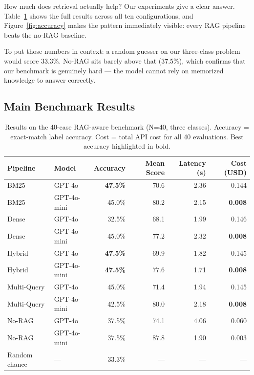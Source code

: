 How much does retrieval actually help? Our experiments give a clear answer.
Table~\ref{tab:main_results} shows the full results across all ten
configurations, and Figure~\ref{fig:accuracy} makes the pattern immediately
visible: every RAG pipeline beats the no-RAG baseline.

To put those numbers in context: a random guesser on our three-class problem
would score 33.3\%. No-RAG sits barely above that (37.5\%), which confirms
that our benchmark is genuinely hard --- the model cannot rely on memorized
knowledge to answer correctly.

\subsection{Main Benchmark Results}

\begin{table}[t]
\centering
\footnotesize
\caption{Results on the 40-case RAG-aware benchmark (N=40, three classes).
  Accuracy = exact-match label accuracy. Cost = total API cost for all 40
  evaluations. Best accuracy highlighted in bold.}
\label{tab:main_results}
\setlength{\tabcolsep}{8pt}
\begin{tabular}{llrrrr}
\toprule
Pipeline      & Model        & Accuracy        & Mean Score & Latency (s) & Cost (USD) \\
\midrule
BM25          & GPT-4o       & \textbf{47.5\%} & 70.6       & 2.36        & 0.144 \\
BM25          & GPT-4o-mini  & 45.0\%          & 80.2       & 2.15        & \textbf{0.008} \\
Dense         & GPT-4o       & 32.5\%          & 68.1       & 1.99        & 0.146 \\
Dense         & GPT-4o-mini  & 45.0\%          & 77.2       & 2.32        & \textbf{0.008} \\
Hybrid        & GPT-4o       & \textbf{47.5\%} & 69.9       & 1.82        & 0.145 \\
Hybrid        & GPT-4o-mini  & \textbf{47.5\%} & 77.6       & 1.71        & \textbf{0.008} \\
Multi-Query   & GPT-4o       & 45.0\%          & 71.4       & 1.94        & 0.145 \\
Multi-Query   & GPT-4o-mini  & 42.5\%          & 80.0       & 2.18        & \textbf{0.008} \\
No-RAG        & GPT-4o       & 37.5\%          & 74.1       & 4.06        & 0.060 \\
No-RAG        & GPT-4o-mini  & 37.5\%          & 87.8       & 1.90        & 0.003 \\
\midrule
Random chance & ---          & 33.3\%          & ---        & ---         & --- \\
\bottomrule
\end{tabular}
\end{table}


